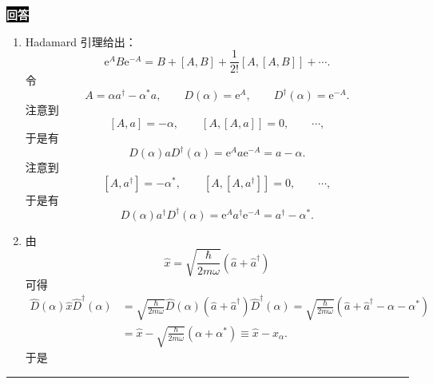 \documentclass[11pt,a4paper]{ctexart}
\newenvironment{answer}
  {\par\smallskip\noindent
   \begingroup
   \setlength{\fboxsep}{4pt}%
   \colorbox{black}{\textcolor{white}{\bfseries 回答}}%
   \endgroup
   \quad\ignorespaces}
  {\par\smallskip\noindent\rule{\linewidth}{0.4pt}\medskip}
\begin{document}
\begin{answer}
  \begin{enumerate}
    \item Hadamard 引理给出：
    \begin{equation}
      \mathrm{e}^{A} B \mathrm{e}^{-A}
      =B + \left[A,B \right] + \frac{1 }{2! } \left[A,\left[A,B \right] \right] + \cdots.
    \end{equation}
    令
    \begin{equation}
      A = \alpha a^\dag - \alpha^*a,\qquad
      D(\alpha) = \mathrm{e}^{A},\qquad
      D^\dag(\alpha) = \mathrm{e}^{-A}.
    \end{equation}
    注意到
    \begin{equation}
      \left[A,a \right]
      =-\alpha,\qquad
      \left[A,\left[A,a \right] \right]
      =0,\qquad \cdots,
    \end{equation}
    于是有
    \begin{equation}
      D(\alpha) a D^\dag(\alpha)
      =\mathrm{e}^{A} a \mathrm{e}^{-A}
      =a - \alpha.
    \end{equation}
    注意到
    \begin{equation}
      \left[A,a^\dag \right]
      =-\alpha^*,\qquad
      \left[A,\left[A,a^\dag \right] \right]
      =0,\qquad \cdots,
    \end{equation}
    于是有
    \begin{equation}
      D(\alpha) a^\dag D^\dag(\alpha)
      =\mathrm{e}^{A} a^\dag \mathrm{e}^{-A}
      =a^\dag - \alpha^*.
    \end{equation}
    \item 由
    \begin{equation}
      \hat{x}
      =\sqrt{\frac{\hbar }{2m\omega } }\left(\hat{a}+\hat{a}^\dag \right)
    \end{equation}
    可得
    \begin{equation}
      \begin{aligned}
        \hat{D}(\alpha) \hat{x} \hat{D}^\dag(\alpha)
        &=\sqrt{\frac{\hbar }{2m\omega } } \hat{D}(\alpha) \left(\hat{a}+\hat{a}^\dag \right) \hat{D}^\dag(\alpha)
        =\sqrt{\frac{\hbar }{2m\omega } } \left(\hat{a}+\hat{a}^\dag - \alpha-\alpha^* \right) \\
        &=\hat{x} - \sqrt{\frac{\hbar }{2m\omega } } \left(\alpha+\alpha^* \right)
        \equiv \hat{x} - x_\alpha.
      \end{aligned}
    \end{equation}
    于是
    \begin{equation}

\end{equation}
\end{enumerate}
\end{answer}
\end{document}
